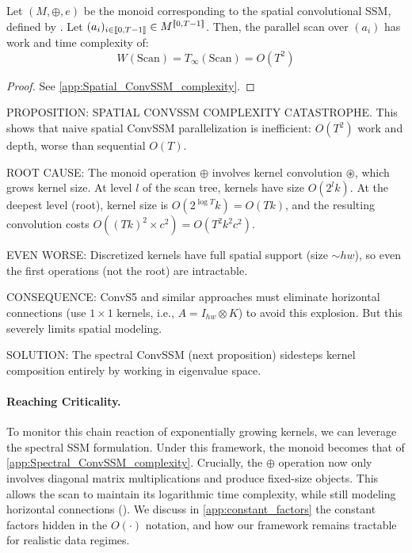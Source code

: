 \documentclass{article}
\begin{document}
\begin{proposition}
\label{prop:Spatial_ConvSSM_complexity}
    Let $(M, \oplus, e)$ be the monoid corresponding to the spatial convolutional SSM, defined by . Let $(a_i)_{i\in \llbracket 0, T-1 \rrbracket}\in M^{\llbracket 0, T-1 \rrbracket}$. Then, the parallel scan over $(a_i)$ has work and time complexity of:
\[
    W(\mathrm{Scan}) = T_\infty(\mathrm{Scan}) = O(T^2)
\]
\end{proposition}

\begin{proof}
See \cref{app:Spatial_ConvSSM_complexity}.
\end{proof}

\begin{thomasbox}
PROPOSITION: SPATIAL CONVSSM COMPLEXITY CATASTROPHE. This shows that naive spatial ConvSSM parallelization is inefficient: $O(T^2)$ work and depth, worse than sequential $O(T)$.

ROOT CAUSE: The monoid operation $\oplus$ involves kernel convolution $\circledast$, which grows kernel size. At level $l$ of the scan tree, kernels have size $O(2^l k)$. At the deepest level (root), kernel size is $O(2^{\log T} k) = O(Tk)$, and the resulting convolution costs $O((Tk)^2 \times c^2) = O(T^2 k^2 c^2)$.

EVEN WORSE: Discretized kernels have full spatial support (size $\sim hw$), so even the first operations (not the root) are intractable.

CONSEQUENCE: ConvS5 and similar approaches must eliminate horizontal connections (use $1 \times 1$ kernels, i.e., $A = I_{hw} \otimes K$) to avoid this explosion. But this severely limits spatial modeling.

SOLUTION: The spectral ConvSSM (next proposition) sidesteps kernel composition entirely by working in eigenvalue space.
\end{thomasbox}

\paragraph{Reaching Criticality.} To monitor this chain reaction of exponentially growing kernels, we can leverage the spectral SSM formulation. Under this framework, the monoid becomes that of \cref{app:Spectral_ConvSSM_complexity}. Crucially, the $\oplus$ operation now only involves diagonal matrix multiplications and produce fixed-size objects. This allows the scan to maintain its logarithmic time complexity, while still modeling horizontal connections (). We discuss in \cref{app:constant_factors} the constant factors hidden in the $O(\cdot)$ notation, and how our framework remains tractable for realistic data regimes.
\end{document}
